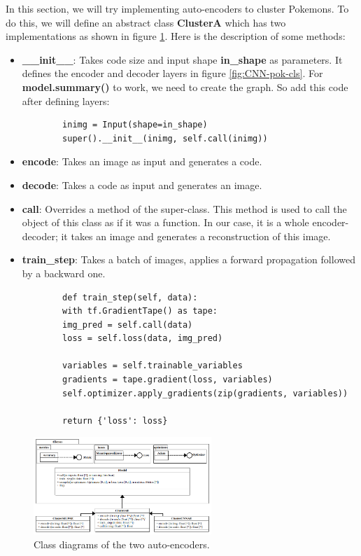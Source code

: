 \documentclass[11pt, a4paper]{article}
\begin{document}
In this section, we will try implementing auto-encoders to cluster Pokemons. 
To do this, we will define an abstract class \textbf{ClusterA} which has two implementations as shown in figure \ref{fig:pok-cluster-CD-en}.
Here is the description of some methods: 
\begin{itemize}
	\item \textbf{\_\_init\_\_}: Takes code size and input shape \textbf{in\_shape} as parameters.
	It defines the encoder and decoder layers in figure \ref{fig:CNN-pok-cls}.
	For \textbf{model.summary()} to work, we need to create the graph. So add this code after defining layers:
	\begin{verbatim}
		inimg = Input(shape=in_shape)
		super().__init__(inimg, self.call(inimg))
	\end{verbatim}
	\item \textbf{encode}: Takes an image as input and generates a code.
	\item \textbf{decode}: Takes a code as input and generates an image.
	\item \textbf{call}: Overrides a method of the super-class. 
	This method is used to call the object of this class as if it was a function.
	In our case, it is a whole encoder-decoder; it takes an image and generates a reconstruction of this image.
	\item \textbf{train\_step}: Takes a batch of images, applies a forward propagation followed by a backward one.
	\begin{verbatim}
		def train_step(self, data):
		with tf.GradientTape() as tape:
		img_pred = self.call(data)
		loss = self.loss(data, img_pred)
		
		variables = self.trainable_variables 
		gradients = tape.gradient(loss, variables)
		self.optimizer.apply_gradients(zip(gradients, variables))
		
		return {'loss': loss}
	\end{verbatim}
\end{itemize}

\begin{figure}[htp]
	\centering
	\includegraphics[width=0.6\textwidth]{../../img/workshop/pok-cluster-classD-en.png}
	\caption{Class diagrams of the two auto-encoders.}
	\label{fig:pok-cluster-CD-en}
\end{figure}
\end{document}
